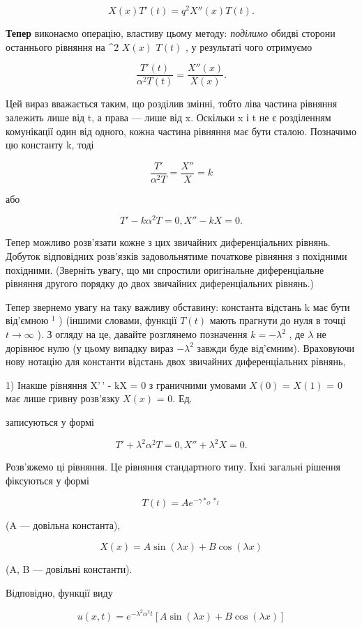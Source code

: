 \documentclass[
  ukrainian,
]{article}
\begin{document}
\[
X(x) T'(t) = q^2 X''(x) T(t).
\]

\textbf{Тепер} виконаємо операцію, властиву цьому методу:
\emph{поділимо} обидві сторони останнього рівняння на \alpha\^{}2
\(X(x)\) \(T(t)\) , у результаті чого отримуємо

\[
\frac{T'(t)}{\alpha^2 T(t)} = \frac{X''(x)}{X(x)}.
\]

Цей вираз вважається таким, що розділив змінні, тобто ліва частина
рівняння залежить лише від t, а права --- лише від x. Оскільки x і t не
є розділенням комунікації один від одного, кожна частина рівняння має
бути сталою. Позначимо цю константу k, тоді

\[
\frac{T'}{\alpha^2 T} = \frac{X''}{X} = k
\]

або

\[
T'-k\alpha^2T=0,
X''-kX=0.
\]

Тепер можливо розв'язати кожне з цих звичайних диференціальних рівнянь.
Добуток відповідних розв'язків задовольнятиме початкове рівняння з
похідними похідними. (Зверніть увагу, що ми спростили оригінальне
диференціальне рівняння другого порядку до двох звичайних
диференціальних рівнянь.)

Тепер звернемо увагу на таку важливу обставину: константа відстань k має
бути від'ємною \(^1\) ) (іншими словами, функції \(T(t)\) мають прагнути
до нуля в точці \(t \to \infty\) ). З огляду на це, давайте розглянемо
позначення \(k = -\lambda^2\) , де \(\lambda\) не дорівнює нулю (у цьому
випадку вираз \(-\lambda^2\) завжди буде від'ємним). Враховуючи нову
нотацію для константи відстань двох звичайних диференціальних рівнянь,

1) Інакше рівняння X'\,' - kX = 0 з граничними умовами \(X(0)\) =
\(X(1)\) = 0 має лише гривну розв'язку \(X(x)\) = 0. Ед.

записуються у формі

\[
T' + \lambda^2 \alpha^2 T = 0,
X'' + \lambda^2 X = 0.
\]

Розв'яжемо ці рівняння. Це рівняння стандартного типу. Їхні загальні
рішення фіксуються у формі

\[
T(t) = Ae^{-\gamma *_{O} *_{I}}
\]

(A --- довільна константа),

\[
X(x) = A \sin(\lambda x) + B \cos(\lambda x)
\]

(A, B --- довільні константи).

Відповідно, функції виду

\[
u(x, t) = e^{-\lambda^2 \alpha^2 t} [A \sin(\lambda x) + B \cos(\lambda x)]
\]
\end{document}
